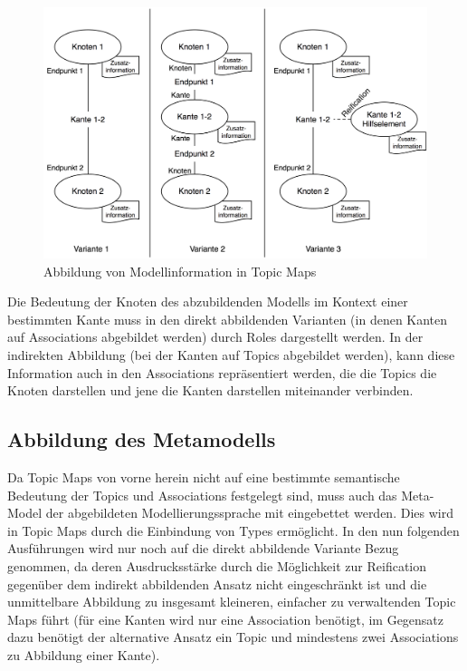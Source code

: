 \begin{figure}[htbp]
	\centering
		\includegraphics[width=13cm]{img/Persistenz/AssociationReification.png}
	\caption{Abbildung von Modellinformation in Topic Maps}
	\label{fig:img_Persistenz_AssociationReification}
\end{figure}

Die Bedeutung der Knoten des abzubildenden Modells im Kontext einer bestimmten Kante muss in den direkt abbildenden Varianten (in denen Kanten auf Associations abgebildet werden) durch Roles dargestellt werden. In der indirekten Abbildung (bei der Kanten auf Topics abgebildet werden), kann diese Information auch in den Associations repräsentiert werden, die die Topics die Knoten darstellen und jene die Kanten darstellen miteinander verbinden.

\subsection{Abbildung des Metamodells}
\label{sub:abbildung_des_metamodells}
Da Topic Maps von vorne herein nicht auf eine bestimmte semantische Bedeutung der Topics und Associations festgelegt sind, muss auch das Meta-Model der abgebildeten Modellierungssprache mit eingebettet werden. Dies wird in Topic Maps durch die Einbindung von Types ermöglicht. In den nun folgenden Ausführungen wird nur noch auf die direkt abbildende Variante Bezug genommen, da deren Ausdrucksstärke durch die Möglichkeit zur Reification gegenüber dem indirekt abbildenden Ansatz nicht eingeschränkt ist und die unmittelbare Abbildung zu insgesamt kleineren, einfacher zu verwaltenden Topic Maps führt (für eine Kanten wird nur eine Association benötigt, im Gegensatz dazu benötigt der alternative Ansatz ein Topic und mindestens zwei Associations zu Abbildung einer Kante).

